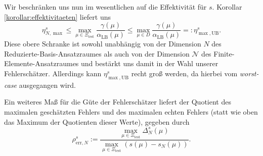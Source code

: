 Wir beschränken uns nun im wesentlichen auf die Effektivität für $s$. Korollar \ref{korollar:effektivitaeten} liefert uns
\begin{equation}
    \eta^s_{N,\max} \leq \max_{\mu \in \Xi_\text{test}} \frac{\gamma(\mu)}{\alpha_{\text{LB}}(\mu)} \leq \max_{\mu \in D} \frac{\gamma(\mu)}{\alpha_{\text{LB}}(\mu)} =: \eta^s_{\max,\text{UB}}.
\end{equation}
Diese obere Schranke ist sowohl unabhängig von der Dimension $N$ des Reduzierte-Basis-Ansatzraumes als auch von der Dimension $\mathcal N$ des Finite-Elemente-Ansatzraumes und bestärkt uns damit in der Wahl unserer Fehlerschätzer. Allerdings kann $\eta^s_{\max,\text{UB}}$ recht groß werden, da hierbei vom \emph{worst-case} ausgegangen wird.

Ein weiteres Maß für die Güte der Fehlerschätzer liefert der Quotient des maximalen geschätzten Fehlers und des maximalen echten Fehlers (statt wie oben das Maximum der Quotienten dieser Werte), gegeben durch
\begin{equation}
     \rho^s_{\text{err},N} := \frac{\max\limits_{\mu \in \Xi_\text{test}} \Delta_N^s(\mu)}{\max\limits_{\mu \in \Xi_\text{test}} (s(\mu) - s_N(\mu))}.
\end{equation}


